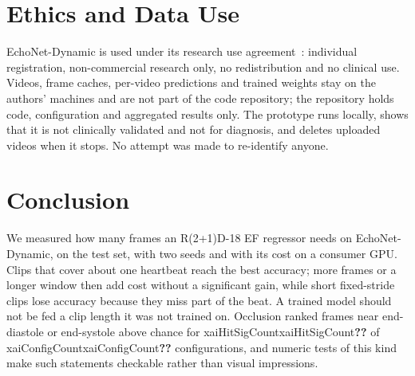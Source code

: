 \documentclass[conference]{IEEEtran}
\newcommand{\res}[1]{\ifcsname #1\endcsname\csname #1\endcsname\else\textbf{??}\fi}
\begin{document}
\section{Ethics and Data Use}
EchoNet-Dynamic is used under its research use agreement~\cite{echonet_site}: individual
registration, non-commercial research only, no redistribution and no clinical use. Videos, frame
caches, per-video predictions and trained weights stay on the authors' machines and are not part
of the code repository; the repository holds code, configuration and aggregated results only. The
prototype runs locally, shows that it is not clinically validated and not for diagnosis, and
deletes uploaded videos when it stops. No attempt was made to re-identify anyone.

\section{Conclusion}
We measured how many frames an R(2+1)D-18 EF regressor needs on EchoNet-Dynamic, on the test set,
with two seeds and with its cost on a consumer GPU. Clips that cover about one heartbeat reach
the best accuracy; more frames or a longer window then add cost without a significant gain,
while short fixed-stride clips lose accuracy because they miss part of the beat. A trained model
should not be fed a clip length it was not trained on. Occlusion ranked frames near end-diastole
or end-systole above chance for \res{xaiHitSigCount} of \res{xaiConfigCount} configurations, and
numeric tests of this kind make such statements checkable rather than visual impressions.



\end{document}
